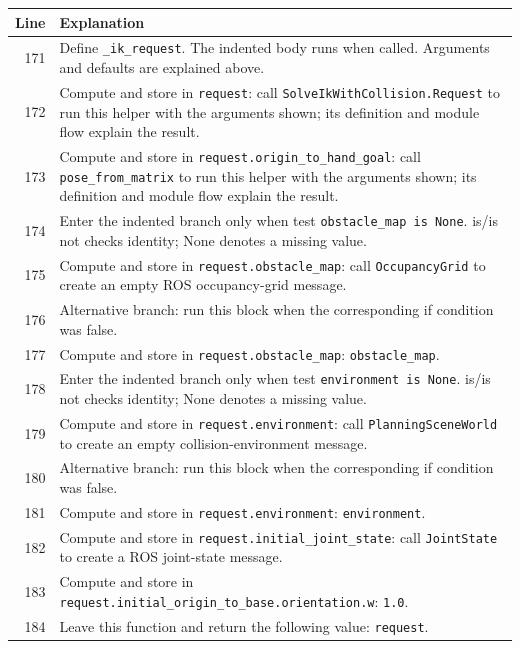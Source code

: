 \documentclass[11pt,a4paper]{book}
\begin{document}
\begin{longtable}{r p{}}

\textbf{Line} & \textbf{Explanation} \\ \hline \endhead

171 & Define \texttt{\_ik\_request}. The indented body runs when called. Arguments and defaults are explained above. \\

172 & Compute and store in \texttt{request}: call \texttt{SolveIkWithCollision.Request} to run this helper with the arguments shown; its definition and module flow explain the result.  \\

173 & Compute and store in \texttt{request.origin\_to\_hand\_goal}: call \texttt{pose\_from\_matrix} to run this helper with the arguments shown; its definition and module flow explain the result.  \\

174 & Enter the indented branch only when test \texttt{obstacle\_map is None}. is/is not checks identity; None denotes a missing value. \\

175 & Compute and store in \texttt{request.obstacle\_map}: call \texttt{OccupancyGrid} to create an empty ROS occupancy-grid message.  \\

176 & Alternative branch: run this block when the corresponding if condition was false. \\

177 & Compute and store in \texttt{request.obstacle\_map}: \texttt{obstacle\_map}.  \\

178 & Enter the indented branch only when test \texttt{environment is None}. is/is not checks identity; None denotes a missing value. \\

179 & Compute and store in \texttt{request.environment}: call \texttt{PlanningSceneWorld} to create an empty collision-environment message.  \\

180 & Alternative branch: run this block when the corresponding if condition was false. \\

181 & Compute and store in \texttt{request.environment}: \texttt{environment}.  \\

182 & Compute and store in \texttt{request.initial\_joint\_state}: call \texttt{JointState} to create a ROS joint-state message.  \\

183 & Compute and store in \texttt{request.initial\_origin\_to\_base.orientation.w}: \texttt{1.0}.  \\

184 & Leave this function and return the following value: \texttt{request}. \\

\end{longtable}
\end{document}

